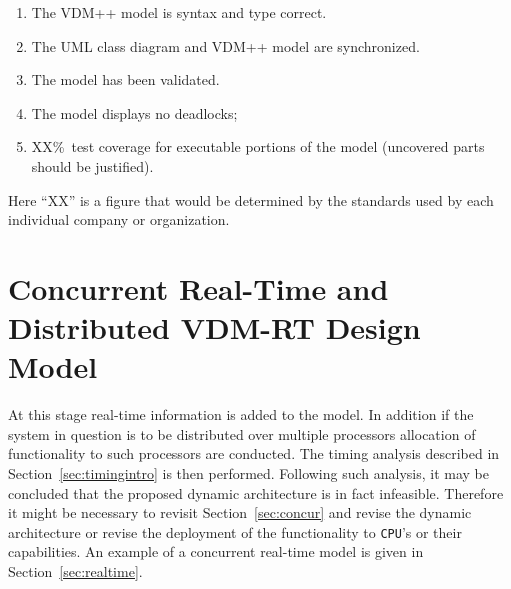 \documentclass{overturerepchap}
\begin{document}
\begin{enumerate}
\item The VDM++ model is syntax and type correct.
\item The UML class diagram and VDM++ model are synchronized.
\item The model has been validated.
\item The model displays no deadlocks;
\item XX\%\ test coverage for executable portions of the model
(uncovered parts should be justified).
\end{enumerate}

Here ``XX'' is a figure that would be determined by the standards used
by each individual company or organization.

\section{Concurrent Real-Time and Distributed VDM-RT Design Model}

At this stage real-time information is added to the model. In addition
if the system in question is to be distributed over multiple
processors allocation of functionality to such processors are
conducted. The timing analysis described in
Section~\ref{sec:timingintro} is then performed. Following such
analysis, it may be concluded that the proposed dynamic architecture
is in fact infeasible. Therefore it might be necessary to revisit
Section~\ref{sec:concur} and revise the dynamic architecture or revise
the deployment of the functionality to \texttt{CPU}'s or 
their capabilities. An
example of a concurrent real-time model is given in
Section~\ref{sec:realtime}.


\end{document}
